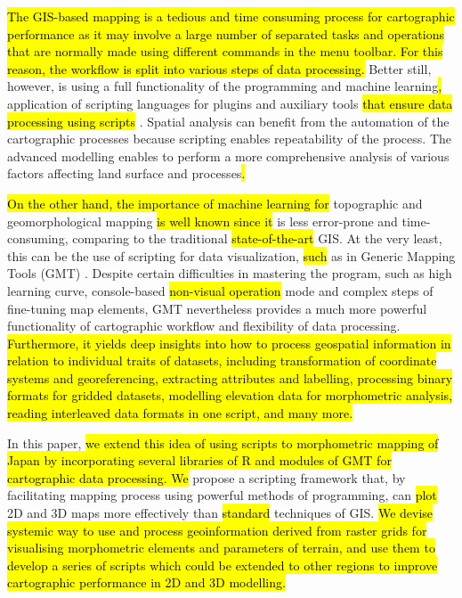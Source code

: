 \documentclass[land,article,submit,pdftex,moreauthors]{Definitions/mdpi}
\begin{document}
\hl{The GIS-based mapping is a tedious and time consuming process for cartographic performance as it may involve a large number of separated tasks and operations that are normally made using different commands in the menu toolbar. For this reason, the workflow is split into various steps of data processing. }Better still, however, is using a full functionality of the programming and machine learning\hl{, }application of scripting languages for plugins and auxiliary tools \hl{that ensure data processing using scripts} \cite{NAGHIBI2021101232}. Spatial analysis can benefit from the automation of the cartographic processes because scripting enables repeatability of the process. The advanced modelling enables to perform a more comprehensive analysis of various factors affecting land surface and processes\hl{.} 

\hl{On the other hand, the importance of machine learning for }topographic and geomorphological mapping\hl{ is well known since it} is less error-prone and time-consuming, comparing to the traditional \hl{state-of-the-art }GIS. At the very least, this can be the use of scripting for data visualization, \hl{such }as in Generic Mapping Tools (GMT) \cite{FARAG2022229297,data7060074}. Despite certain difficulties in mastering the program, such as high learning curve, console-based \hl{non-visual operation} mode and complex steps of fine-tuning map elements, GMT nevertheless provides a much more powerful functionality of cartographic workflow and flexibility of data processing. \hl{Furthermore, it yields deep insights into how to process geospatial information in relation to individual traits of datasets, including transformation of coordinate systems and georeferencing, extracting attributes and labelling, processing binary formats for gridded datasets, modelling elevation data for morphometric analysis, reading interleaved data formats in one script, and many more.}

In this paper, \hl{we extend this idea of using scripts to morphometric mapping of Japan by incorporating several libraries of R and modules of GMT for cartographic data processing. We }propose a scripting framework that, by facilitating mapping process using powerful methods of programming, can \hl{plot }2D and 3D maps more effectively than \hl{standard} techniques of GIS. \hl{We devise systemic way to use and process geoinformation derived from raster grids for visualising morphometric elements and parameters of terrain, and use them to develop a series of scripts which could be extended to other regions to improve cartographic performance in 2D and 3D modelling.}
\end{document}
